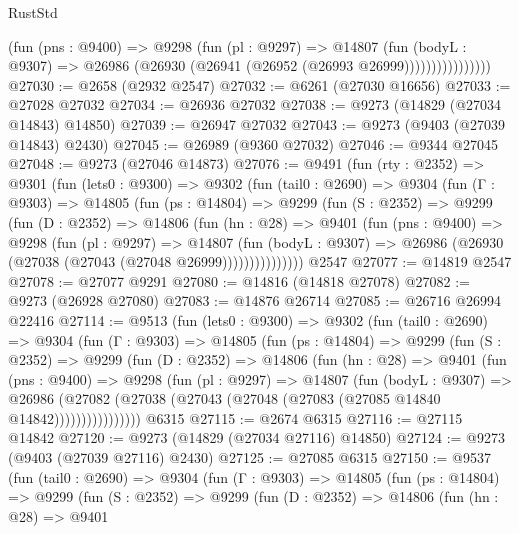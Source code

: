 \begin{lexlean}{RustStd}
\begin{coremodule}
                      (fun (pns : @9400) =>
                      @9298
                        (fun (pl : @9297) =>
                        @14807
                          (fun (bodyL : @9307) =>
                          @26986 (@26930 (@26941 (@26952 (@26993 @26999))))))))))))))))
@27030 := @2658 (@2932 @2547)
@27032 := @6261 (@27030 @16656)
@27033 := @27028 @27032
@27034 := @26936 @27032
@27038 := @9273 (@14829 (@27034 @14843) @14850)
@27039 := @26947 @27032
@27043 := @9273 (@9403 (@27039 @14843) @2430)
@27045 := @26989 (@9360 @27032)
@27046 := @9344 @27045
@27048 := @9273 (@27046 @14873)
@27076 := @9491
    (fun (rty : @2352) =>
    @9301
      (fun (lets0 : @9300) =>
      @9302
        (fun (tail0 : @2690) =>
        @9304
          (fun (Γ : @9303) =>
          @14805
            (fun (ps : @14804) =>
            @9299
              (fun (S : @2352) =>
              @9299
                (fun (D : @2352) =>
                @14806
                  (fun (hn : @28) =>
                  @9401
                    (fun (pns : @9400) =>
                    @9298
                      (fun (pl : @9297) =>
                      @14807
                        (fun (bodyL : @9307) =>
                        @26986 (@26930 (@27038 (@27043 (@27048 @26999)))))))))))))))
    @2547
@27077 := @14819 @2547
@27078 := @27077 @9291
@27080 := @14816 (@14818 @27078)
@27082 := @9273 (@26928 @27080)
@27083 := @14876 @26714
@27085 := @26716 @26994 @22416
@27114 := @9513
    (fun (lets0 : @9300) =>
    @9302
      (fun (tail0 : @2690) =>
      @9304
        (fun (Γ : @9303) =>
        @14805
          (fun (ps : @14804) =>
          @9299
            (fun (S : @2352) =>
            @9299
              (fun (D : @2352) =>
              @14806
                (fun (hn : @28) =>
                @9401
                  (fun (pns : @9400) =>
                  @9298
                    (fun (pl : @9297) =>
                    @14807
                      (fun (bodyL : @9307) =>
                      @26986
                        (@27082
                          (@27038 (@27043 (@27048 (@27083 (@27085 @14840 @14842))))))))))))))))
    @6315
@27115 := @2674 @6315
@27116 := @27115 @14842
@27120 := @9273 (@14829 (@27034 @27116) @14850)
@27124 := @9273 (@9403 (@27039 @27116) @2430)
@27125 := @27085 @6315
@27150 := @9537
    (fun (tail0 : @2690) =>
    @9304
      (fun (Γ : @9303) =>
      @14805
        (fun (ps : @14804) =>
        @9299
          (fun (S : @2352) =>
          @9299
            (fun (D : @2352) =>
            @14806
              (fun (hn : @28) =>
              @9401

\end{coremodule}
\end{lexlean}
